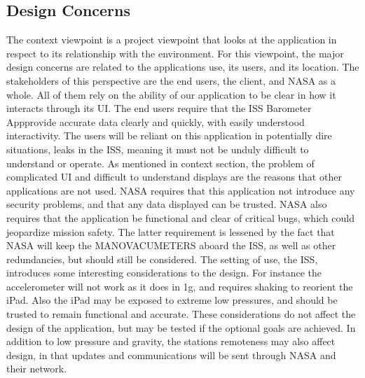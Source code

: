 \documentclass[onecolumn, draftclsnofoot,10pt, compsoc]{IEEEtran}
\def \CapstoneProjectName{ISS Barometer App}
\begin{document}
\subsection{Design Concerns}
The context viewpoint is a project viewpoint that looks at the application in respect to its relationship with the environment.
For this viewpoint, the major design concerns are related to the applications use, its users, and its location.
The stakeholders of this perspective are the end users, the client, and NASA as a whole.
All of them rely on the ability of our application to be clear in how it interacts through its UI.
The end users require that the \CapstoneProjectName provide accurate data clearly and quickly, with easily understood interactivity.
The users will be reliant on this application in potentially dire situations, leaks in the ISS, meaning it must not be unduly difficult to understand or operate.
As mentioned in context section, the problem of complicated UI and difficult to understand displays are the reasons that other applications are not used.
NASA requires that this application not introduce any security problems, and that any data displayed can be trusted.
NASA also requires that the application be functional and clear of critical bugs, which could jeopardize mission safety.
The latter requirement is lessened by the fact that NASA will keep the MANOVACUMETERS aboard the ISS, as well as other redundancies, but should still be considered.
The setting of use, the ISS, introduces some interesting considerations to the design.
For instance the accelerometer will not work as it does in 1g, and requires shaking to reorient the iPad.
Also the iPad may be exposed to extreme low pressures, and should be trusted to remain functional and accurate.
These considerations do not affect the design of the application, but may be tested if the optional goals are achieved.
In addition to low pressure and gravity, the stations remoteness may also affect design, in that updates and communications will be sent through NASA and their network.
\end{document}
